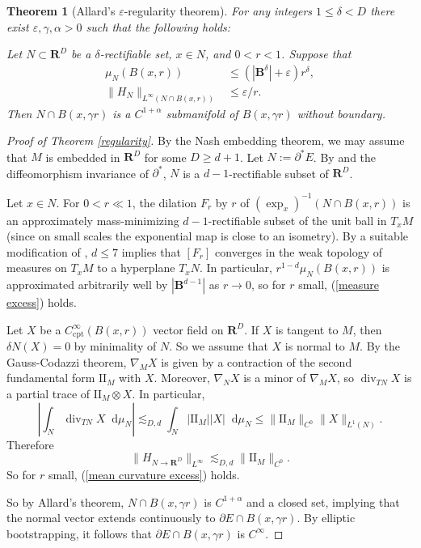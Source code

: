 \documentclass[reqno,11pt]{amsart}
\newcommand{\RR}{\mathbf{R}}
\newcommand{\Ball}{\mathbf{B}}
\newcommand*\dif{\mathop{}\!\mathrm{d}}
\newcommand{\Two}{\mathrm{I\!I}}
\DeclareMathOperator{\Div}{div}
\newcommand{\cpt}{\mathrm{cpt}}
\newtheorem{theorem}{Theorem}[section]
\theoremstyle{definition}
\numberwithin{equation}{section}
\begin{document}
\begin{theorem}[Allard's $\varepsilon$-regularity theorem]
For any integers $1 \leq \delta < D$ there exist $\varepsilon, \gamma, \alpha > 0$ such that the following holds:

Let $N \subset \RR^D$ be a $\delta$-rectifiable set, $x \in N$, and $0 < r < 1$.
Suppose that
\begin{align}
\mu_N(B(x, r)) &\leq (|\Ball^\delta| + \varepsilon) r^\delta, \label{measure excess}\\
\|H_N\|_{L^\infty(N \cap B(x, r))} &\leq \varepsilon/r. \label{mean curvature excess}
\end{align}
Then $N \cap B(x, \gamma r)$ is a $C^{1 + \alpha}$ submanifold of $B(x, \gamma r)$ without boundary.
\end{theorem}

\begin{proof}[Proof of Theorem \ref{regularity}]
By the Nash embedding theorem, we may assume that $M$ is embedded in $\RR^D$ for some $D \geq d + 1$.
Let $N := \partial^* E$. 
By \cite[Theorem 4.11]{Giusti77} and the diffeomorphism invariance of $\partial^*$, $N$ is a $d - 1$-rectifiable subset of $\RR^D$.

Let $x \in N$.
For $0 < r \ll 1$, the dilation $F_r$ by $r$ of $(\exp_x)^{-1}(N \cap B(x, r))$ is an approximately mass-minimizing $d - 1$-rectifiable subset of the unit ball in $T_x M$ (since on small scales the exponential map is close to an isometry).
By a suitable modification of \cite[Chapters 9-10]{Giusti77}, $d \leq 7$ implies that $[F_r]$ converges in the weak topology of measures on $T_x M$ to a hyperplane $T_x N$.
In particular, $r^{1 - d} \mu_N(B(x, r))$ is approximated arbitrarily well by $|\Ball^{d - 1}|$ as $r \to 0$, so for $r$ small, (\ref{measure excess}) holds.

Let $X$ be a $C^\infty_\cpt(B(x, r))$ vector field on $\RR^D$.
If $X$ is tangent to $M$, then $\delta N(X) = 0$ by minimality of $N$.
So we assume that $X$ is normal to $M$.
By the Gauss-Codazzi theorem, $\nabla_M X$ is given by a contraction of the second fundamental form $\Two_M$ with $X$.
Moreover, $\nabla_N X$ is a minor of $\nabla_M X$, so $\Div_{TN} X$ is a partial trace of $\Two_M \otimes X$.
In particular,
$$\left|\int_N \Div_{TN} X \dif \mu_N\right| \lesssim_{D, d} \int_N |\Two_M| |X| \dif \mu_N \leq \|\Two_M\|_{C^0} \|X\|_{L^1(N)}.$$
Therefore 
$$\|H_{N \to \RR^D}\|_{L^\infty} \lesssim_{D, d} \|\Two_M\|_{C^0}.$$
So for $r$ small, (\ref{mean curvature excess}) holds.

So by Allard's theorem, $N \cap B(x, \gamma r)$ is $C^{1 + \alpha}$ and a closed set, implying that the normal vector extends continuously to $\partial E \cap B(x, \gamma r)$.
By elliptic bootstrapping, it follows that $\partial E \cap B(x, \gamma r)$ is $C^\infty$.
\end{proof}
\end{document}
